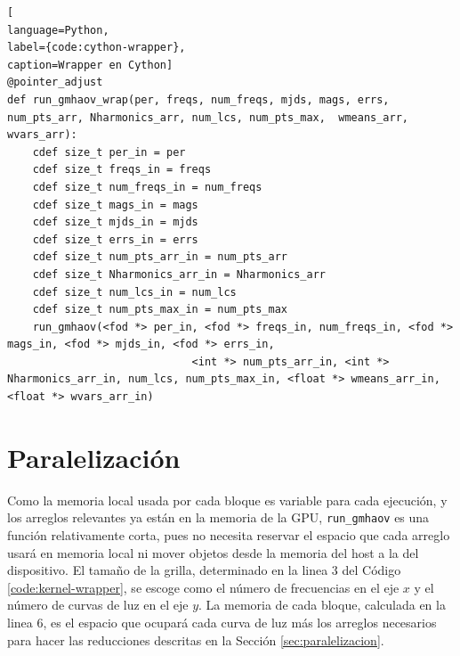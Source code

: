 \begin{lstlisting}[
language=Python,
label={code:cython-wrapper},
caption=Wrapper en Cython]
@pointer_adjust
def run_gmhaov_wrap(per, freqs, num_freqs, mjds, mags, errs, num_pts_arr, Nharmonics_arr, num_lcs, num_pts_max,  wmeans_arr, wvars_arr):
    cdef size_t per_in = per
    cdef size_t freqs_in = freqs
    cdef size_t num_freqs_in = num_freqs
    cdef size_t mags_in = mags
    cdef size_t mjds_in = mjds
    cdef size_t errs_in = errs
    cdef size_t num_pts_arr_in = num_pts_arr
    cdef size_t Nharmonics_arr_in = Nharmonics_arr
    cdef size_t num_lcs_in = num_lcs
    cdef size_t num_pts_max_in = num_pts_max
    run_gmhaov(<fod *> per_in, <fod *> freqs_in, num_freqs_in, <fod *> mags_in, <fod *> mjds_in, <fod *> errs_in,
                             <int *> num_pts_arr_in, <int *> Nharmonics_arr_in, num_lcs, num_pts_max_in, <float *> wmeans_arr_in, <float *> wvars_arr_in)
\end{lstlisting}

\section{Paralelización}\label{sec:paralelización-implementacion}
Como la memoria local usada por cada bloque es variable para cada ejecución, y los arreglos relevantes ya están en la memoria de la GPU, \texttt{run\_gmhaov} es una función relativamente corta, pues no necesita reservar el espacio que cada arreglo usará en memoria local ni mover objetos desde la memoria del host a la del dispositivo. El tamaño de la grilla, determinado en la linea 3 del Código \ref{code:kernel-wrapper}, se escoge como el número de frecuencias en el eje $x$ y el número de curvas de luz en el eje $y$. La memoria de cada bloque, calculada en la linea 6, es el espacio que ocupará cada curva de luz más los arreglos necesarios para hacer las reducciones descritas en la Sección \ref{sec:paralelizacion}.

